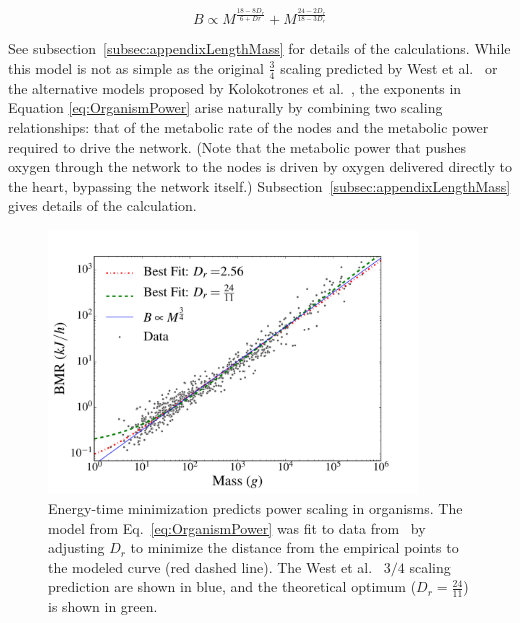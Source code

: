 \documentclass[12pt]{article}
\begin{document}
\begin{equation}
  \label{eq:OrganismPower}
  B \propto M^{\frac{18-8D_r}{6+Dr}} + M^{\frac{24-2D_r}{18-3D_r}} 
\end{equation}


\noindent See subsection~\ref{subsec:appendixLengthMass} for details of the calculations.
While this model is not as simple as the original $\frac{3}{4}$
scaling predicted by West et al.~\cite{west97} or the alternative models
proposed by Kolokotrones et al.~\cite{kolokotrones2010curvature}, the exponents in Equation \ref{eq:OrganismPower} arise naturally by combining two scaling relationships: that of the metabolic rate of the nodes and the metabolic power required to drive the network. (Note that the metabolic power that pushes oxygen through the network to the nodes is driven by oxygen delivered directly to the heart, bypassing the network itself.) Subsection~\ref{subsec:appendixLengthMass} gives details of the calculation.


\begin{figure}[!h] \centering
  \includegraphics[height=70mm]{Figures/OrganismsPowerScalingv2.pdf}

  \caption{Energy-time minimization predicts power
    scaling in organisms. The model from Eq.~\ref{eq:OrganismPower}
    was fit to data from~\cite{kolokotrones2010curvature} by adjusting
    $D_r$ to minimize the distance
    from the empirical points to the modeled curve (red dashed line).  The West et
    al.~\cite{west97} $3/4$ scaling prediction are shown in blue, and
    the theoretical optimum ($D_r = \frac{24}{11}$) is shown in green.
    }
\label{fig:OrganismsPowerScaling}
\end{figure}
\end{document}
